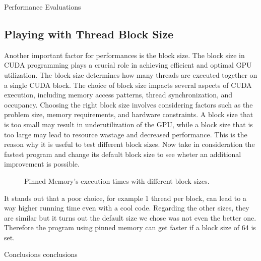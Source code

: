 \documentclass[a4paper,oneside,11pt,DIV12,headsepline,footexclude,headexclude]{scrartcl}
\begin{document}
\begin{section}{Performance Evaluations}
\subsection{Playing with Thread Block Size}
Another important factor for performances is the block size. The block size in CUDA programming plays a crucial role in achieving efficient and optimal GPU utilization. The block size determines how many threads are executed together on a single CUDA block.
The choice of block size impacts several aspects of CUDA execution, including memory access patterns, thread synchronization, and occupancy. Choosing the right block size involves considering factors such as the problem size, memory requirements, and hardware constraints. A block size that is too small may result in underutilization of the GPU, while a block size that is too large may lead to resource wastage and decreased performance. This is the reason why it is useful to test different block sizes. Now take in consideration the fastest program and change its default block size to see wheter an additional improvement is possible.
\begin{figure}[H]
    \centering
    
    \caption{Pinned Memory's execution times with different block sizes.}
    \label{bs}
\end{figure}
It stands out that a poor choice, for example 1 thread per block, can lead to a way higher running time even with a cool code. Regarding the other sizes, they are similar but it turns out the default size we chose was not even the better one. Therefore the program using pinned memory can get faster if a block size of 64 is set.
\end{section}
\newpage
\begin{section}{Conclusions}
conclusions
\end{section}
\end{document}
